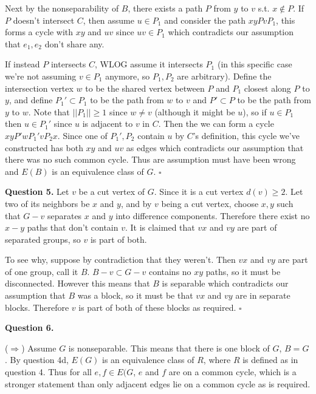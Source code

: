\documentclass[letterpaper, reqno,11pt]{article}
\begin{document}
Next by the nonseparability of $B$, there exists a path $P$ from $y$ to $v$ s.t. $x\not\in  P$. If $P$ doesn't intersect $C$, then assume $u\in P_1$ and consider the path $xyPvP_1$, this forms a cycle with $xy$ and $uv$ since $uv\in P_1$ which contradicts our assumption that $e_1,e_2$ don't share any. 

If instead $P$ intersects $C$, WLOG assume it intersects $P_1$ (in this specific case we're not assuming $v\in P_1$ anymore, so $P_1,P_2$ are arbitrary). Define the intersection vertex $w$ to be the shared vertex between $P$ and $P_1$ closest along $P$ to $y$, and define $P_1'\subset P_1$ to be the path from $w$ to $v$ and $P'\subset P$ to be the path from $y$ to $w$. Note that $||P_1||\geq 1$ since $w\neq v$ (although it might be $u$), so if $u\in P_1$ then $u\in P_1'$ since $u$ is adjacent to $v$ in $C$. Then the we can form a cycle $xyP'wP_1'vP_2x$. Since one of $P_1',P_2$ contain $u$ by $C$'s definition, this cycle we've constructed has both $xy$ and $uv$ as edges which contradicts our assumption that there was no such common cycle. Thus are assumption must have been wrong and $E(B)$ is an equivalence class of $G$. $\square$


{\medskip\noindent\bf Question 5.} Let $v$ be a cut vertex of $G$. Since it is a cut vertex $d(v)\geq 2$. Let two of its neighbors be $x$ and $y$, and by $v$ being a cut vertex, choose $x,y$ such that $G-v$ separates $x$ and $y$ into difference components. Therefore there exist no $x-y$ paths that don't contain $v$. It is claimed that $vx$ and $vy$ are part of separated groups, so $v$ is part of both. 

To see why, suppose by contradiction that they weren't. Then $vx$ and $vy$ are part of one group, call it $B$. $B-v\subset G-v$ contains no $xy$ paths, so it must be disconnected. However this means that $B$ is separable which contradicts our assumption that $B$ was a block, so it must be that $vx$ and $vy$ are in separate blocks. Therefore $v$ is part of both of these blocks as required. $\square$

{\medskip\noindent\bf Question 6.} 

($\Rightarrow$) Assume $G$ is nonseparable. This means that there is one block of $G$, $B=G$. By question 4d, $E(G)$ is an equivalence class of $R$, where $R$ is defined as in question 4. Thus for all $e,f\in E(G$, $e$ and $f$ are on a common cycle, which is a stronger statement than only adjacent edges lie on a common cycle as is required. 
\end{document}
